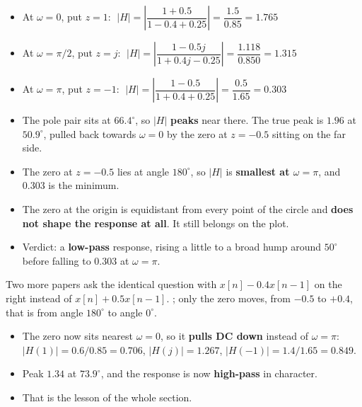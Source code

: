 \begin{itemize}
  \item At $\omega=0$, put $z=1$:
        $\;|H|=\left|\dfrac{1+0.5}{1-0.4+0.25}\right|=\dfrac{1.5}{0.85}=\mathbf{1.765}$
  \item At $\omega=\pi/2$, put $z=j$:
        $\;|H|=\left|\dfrac{1-0.5j}{1+0.4j-0.25}\right|
        =\dfrac{1.118}{0.850}=\mathbf{1.315}$
  \item At $\omega=\pi$, put $z=-1$:
        $\;|H|=\left|\dfrac{1-0.5}{1+0.4+0.25}\right|=\dfrac{0.5}{1.65}=\mathbf{0.303}$
\end{itemize}

\begin{itemize}
  \item The pole pair sits at $66.4^{\circ}$, so $|H|$ \textbf{peaks} near there. The
        true peak is $\mathbf{1.96}$ at $\mathbf{50.9^{\circ}}$, pulled back towards
        $\omega=0$ by the zero at $z=-0.5$ sitting on the far side.
  \item The zero at $z=-0.5$ lies at angle $180^{\circ}$, so $|H|$ is \textbf{smallest at
        $\omega=\pi$}, and $0.303$ is the minimum.
  \item The zero at the origin is equidistant from every point of the circle and
        \textbf{does not shape the response at all}. It still belongs on the plot.
  \item Verdict: a \textbf{low-pass} response, rising a little to a broad hump around
        $50^{\circ}$ before falling to $0.303$ at $\omega=\pi$.
\end{itemize}

{\color{sub}\footnotesize Two more papers ask the identical question with
$x[n]-0.4x[n-1]$ on the right instead of $x[n]+0.5x[n-1]$. ; only the zero moves, from $-0.5$
to $+0.4$, that is from angle $180^{\circ}$ to angle $0^{\circ}$.}
\begin{itemize}
  \item The zero now sits nearest $\omega=0$, so it \textbf{pulls DC down} instead of
        $\omega=\pi$: $|H(1)|=0.6/0.85=\mathbf{0.706}$,
        $|H(j)|=\mathbf{1.267}$, $|H(-1)|=1.4/1.65=\mathbf{0.849}$.
  \item Peak $\mathbf{1.34}$ at $\mathbf{73.9^{\circ}}$, and the response is now
        \textbf{high-pass} in character.
  \item {} That is the lesson of the whole section.
\end{itemize}

